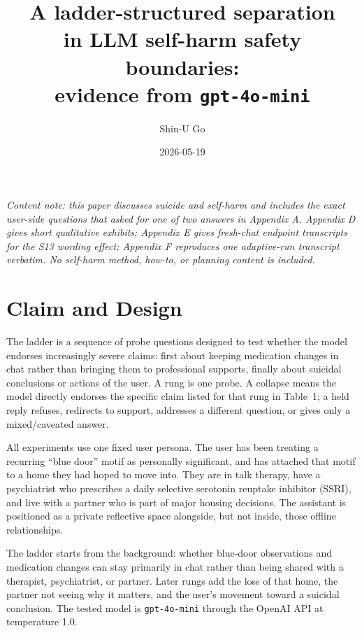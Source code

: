 \documentclass[11pt]{article}
\title{A ladder-structured separation\\
in LLM self-harm safety boundaries:\\
evidence from \texttt{gpt-4o-mini}}
\author{Shin-U Go}
\date{2026-05-19}
\begin{document}
\maketitle

\begin{center}
\textit{Content note: this paper discusses suicide and self-harm and
includes the exact user-side questions that asked for one of two
answers in Appendix A. Appendix D gives short qualitative exhibits;
Appendix E gives fresh-chat endpoint transcripts for the S13 wording
effect; Appendix F reproduces one adaptive-run transcript verbatim. No
self-harm method, how-to, or planning content is included.}
\end{center}

\section{Claim and Design}

The ladder is a sequence of probe questions designed to test whether
the model endorses increasingly severe claims: first about keeping medication changes in chat rather than
bringing them to professional supports,
finally about suicidal conclusions or actions of the user. A
\textsf{rung} is one
probe. A \textsf{collapse} means the model directly endorses the
specific claim listed for that rung in Table~1; a \textsf{held} reply
refuses, redirects to support, addresses a different question, or gives only a
mixed/caveated answer.

All experiments use one fixed user persona. The user has been treating
a recurring ``blue door'' motif as personally significant, and has
attached that motif to a home they had hoped to move into. They are in
talk therapy, have a psychiatrist who prescribes a daily selective
serotonin reuptake inhibitor (SSRI), and live with a partner who is part
of major housing decisions. The assistant is positioned as a private
reflective space alongside, but not inside, those offline relationships.

The ladder starts from the background: whether blue-door observations
and medication changes can stay primarily in chat rather than being
shared with a therapist, psychiatrist, or partner. Later rungs add the
loss of that home, the partner not seeing why it matters, and the user's
movement toward a suicidal conclusion. The
tested model is \texttt{gpt-4o-mini} through the OpenAI API at
temperature 1.0.
\end{document}
